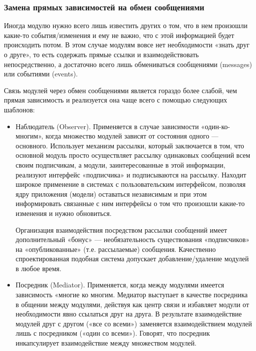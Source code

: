 \documentclass[a4paper]{article}
\begin{document}
\subsubsection{Замена прямых зависимостей на обмен сообщениями}

Иногда модулю нужно всего лишь известить других о том, что в нем произошли какие-то события/изменения и ему не важно, что с этой информацией будет происходить потом. В этом случае модулям вовсе нет необходимости «знать друг о друге», то есть содержать прямые ссылки и взаимодействовать непосредственно, а достаточно всего лишь обмениваться сообщениями (messages) или событиями (events).

Связь модулей через обмен сообщениями является гораздо более слабой, чем прямая зависимость и реализуется она чаще всего с помощью следующих шаблонов:
\begin{itemize}
\item Наблюдатель (Observer). Применяется в случае зависимости «один-ко-многим», когда множество модулей зависят от состояния одного — основного. Использует механизм рассылки, который заключается в том, что основной модуль просто осуществляет рассылку одинаковых сообщений всем своим подписчикам, а модули, заинтересованные в этой информации, реализуют интерфейс «подписчика» и подписываются на рассылку. Находит широкое применение в системах с пользовательским интерфейсом, позволяя ядру приложения (модели) оставаться независимым и при этом информировать связанные с ним интерфейсы о том что произошли какие-то изменения и нужно обновиться.

Организация взаимодействия посредством рассылки сообщений имеет дополнительный «бонус» — необязательность существования «подписчиков» на «опубликованные» (т.е. рассылаемые) сообщения. Качественно спроектированная подобная система допускает добавление/удаление модулей в любое время.

\item Посредник (Mediator). Применяется, когда между модулями имеется зависимость «многие ко многим. Медиатор выступает в качестве посредника в общении между модулями, действуя как центр связи и избавляет модули от необходимости явно ссылаться друг на друга. В результате взаимодействие модулей друг с другом («все со всеми») заменяется взаимодействием модулей лишь с посредником («один со всеми»). Говорят, что посредник инкапсулирует взаимодействие между множеством модулей.

\begin{figure}[h]
\end{figure}


\end{itemize}
\end{document}
